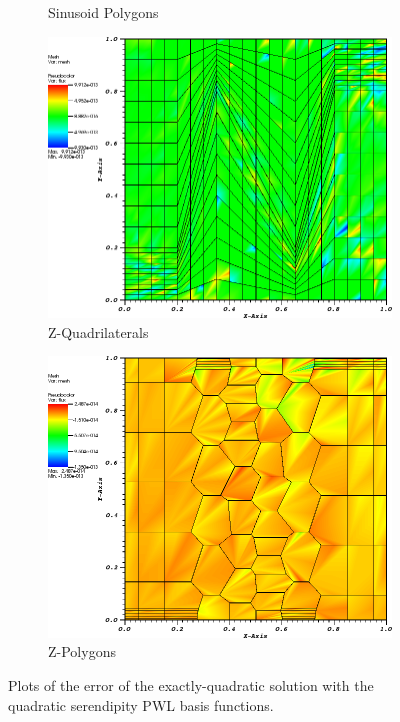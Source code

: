 \begin{figure}
{\begin{subfigure}[b]{0.465\textwidth}
		\caption{Sinusoid Polygons}
	\end{subfigure}
}
{
	\vspace{3mm}
	\begin{subfigure}[b]{0.465\textwidth}
		\centering
		\label{subfig::z_quad_me_k2_lin_sol}
		\includegraphics[width=\textwidth]{figures/sec_BF/quad_err_zquad_PWL2.png}
		\caption{Z-Quadrilaterals}
	\end{subfigure}
	\hfill
	\begin{subfigure}[b]{0.465\textwidth}
		\centering
		\label{subfig::z_poly_me_k2_lin_sol}
		\includegraphics[width=\textwidth]{figures/sec_BF/quad_err_zpoly_PWL2.png}
		\caption{Z-Polygons}
	\end{subfigure}
}
\caption{Plots of the error of the exactly-quadratic solution with the quadratic serendipity PWL basis functions.}
\label{fig::BF_Results_quad_err_PWL2}
\end{figure}

